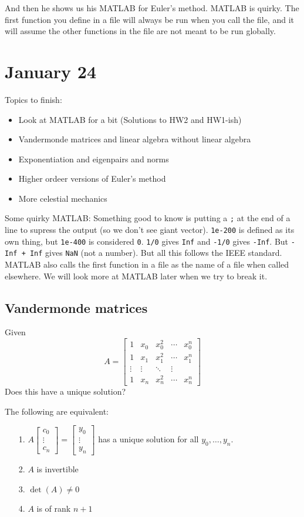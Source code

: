 \documentclass{article}
\theoremstyle{plain}
\theoremstyle{remark}
\begin{document}
And then he shows us his MATLAB for Euler's method.
MATLAB is quirky.
The first function you define in a file will always be run
when you call the file,
and it will assume the other functions in the file are not meant to be run globally.

\section{January 24}
Topics to finish:
\begin{itemize}
	\item Look at MATLAB for a bit (Solutions to HW2 and HW1-ish)
	\item Vandermonde matrices and linear algebra without linear algebra
	\item Exponentiation and eigenpairs and norms
	\item Higher ordeer versions of Euler's method
	\item More celestial mechanics
\end{itemize}

Some quirky MATLAB:
Something good to know is putting a \verb|;| at the end of a line
to supress the output (so we don't see giant vector).
\verb|1e-200| is defined as its own thing, but \verb|1e-400| is considered \verb|0|.
\verb|1/0| gives \verb|Inf| and \verb|-1/0| gives \verb|-Inf|.
But \verb|-Inf + Inf| gives \verb|NaN| (not a number).
But all this follows the IEEE standard.
MATLAB also calls the first function in a file
as the name of a file when called elsewhere.
We will look more at MATLAB later when we try to break it.

\subsection{Vandermonde matrices}
Given
\[
	A = \begin{bmatrix} 1 & x_0 & x_0^2 & \cdots & x_0^n\\
		1 & x_1 & x_1^2 & \cdots & x_1^n \\
		\vdots & \vdots & \ddots & \vdots\\
	1 & x_n & x_n^2 & \cdots & x_n^n\end{bmatrix}
\]
Does this have a unique solution?

The following are equivalent:
\begin{enumerate}
	\item[1.] $A\begin{bmatrix} c_0 \\ \vdots \\ c_n \end{bmatrix}
		= \begin{bmatrix} y_0 \\ \vdots \\ y_n \end{bmatrix}$
		has a unique solution for all $y_0,\dots,y_n$.
	\item[2.] $A$ is invertible
	\item[3.] $\det(A) \neq 0$
	\item[4.] $A$ is of rank $n+1$
\end{enumerate}
\end{document}
